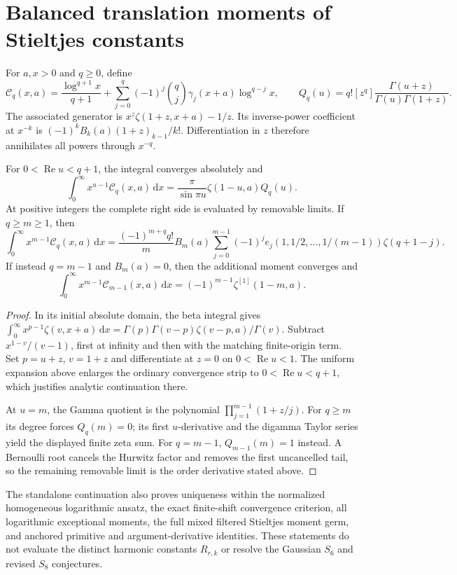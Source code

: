 \section{Balanced translation moments of Stieltjes constants}
\label{bsm:sec:integration}
For $a,x>0$ and $q\ge0$, define
\[
 \mathcal C_q(x,a)=\frac{\log^{q+1}x}{q+1}
 +\sum_{j=0}^{q}(-1)^j\binom qj\gamma_j(x+a)\log^{q-j}x,
 \qquad
 Q_q(u)=q![z^q]\frac{\Gamma(u+z)}{\Gamma(u)\Gamma(1+z)}.
\]
The associated generator is
$x^z\zeta(1+z,x+a)-1/z$. Its inverse-power coefficient at $x^{-k}$
is $(-1)^kB_k(a)(1+z)_{k-1}/k!$. Differentiation in $z$ therefore
annihilates all powers through $x^{-q}$.

\begin{theorem}
\label{bsm:thm:integration-summary}
For $0<\operatorname{Re}u<q+1$, the integral converges absolutely and
\[
 \int_0^\infty x^{u-1}\mathcal C_q(x,a)\,\mathrm{d}x
       =\frac{\pi}{\sin\pi u}\zeta(1-u,a)Q_q(u).
\]
At positive integers the complete right side is evaluated by removable
limits. If $q\ge m\ge1$, then
\[
 \int_0^\infty x^{m-1}\mathcal C_q(x,a)\,\mathrm{d}x
 =\frac{(-1)^{m+q}q!}{m}B_m(a)
       \sum_{j=0}^{m-1}(-1)^j e_j(1,1/2,\ldots,1/(m-1))\zeta(q+1-j).
\]
If instead $q=m-1$ and $B_m(a)=0$, then the additional moment converges and
\[
 \int_0^\infty x^{m-1}\mathcal C_{m-1}(x,a)\,\mathrm{d}x
             =(-1)^{m-1}\zeta^{[1]}(1-m,a).
\]
\end{theorem}

\begin{proof}
In its initial absolute domain, the beta integral gives
$\int_0^\infty x^{p-1}\zeta(v,x+a)\,\mathrm{d}x
=\Gamma(p)\Gamma(v-p)\zeta(v-p,a)/\Gamma(v)$.
Subtract $x^{1-v}/(v-1)$, first at infinity and then with the matching
finite-origin term. Set $p=u+z$, $v=1+z$ and differentiate at $z=0$ on
$0<\operatorname{Re}u<1$. The uniform expansion above enlarges the
ordinary convergence strip to $0<\operatorname{Re}u<q+1$, which justifies
analytic continuation there.

At $u=m$, the Gamma quotient is the polynomial
$\prod_{j=1}^{m-1}(1+z/j)$. For $q\ge m$ its degree forces $Q_q(m)=0$;
its first $u$-derivative and the digamma Taylor series yield the displayed
finite zeta sum. For $q=m-1$, $Q_{m-1}(m)=1$ instead. A Bernoulli root
cancels the Hurwitz factor and removes the first uncancelled tail,
so the remaining removable limit is the order derivative stated above.
\end{proof}

The standalone continuation also proves uniqueness within the normalized
homogeneous logarithmic ansatz, the exact finite-shift convergence criterion,
all logarithmic exceptional moments, the full mixed filtered Stieltjes
moment germ, and anchored primitive and argument-derivative identities.
These statements do not evaluate the distinct harmonic constants $R_{r,k}$
or resolve the Gaussian $S_6$ and revised $S_8$ conjectures.
